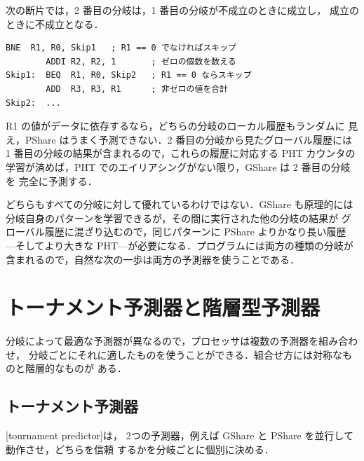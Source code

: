 \documentclass[../main.tex]{subfiles}
\begin{document}
\begin{example}
  次の断片では，2 番目の分岐は，1 番目の分岐が不成立のときに成立し，
  成立のときに不成立となる．
  \begin{lstlisting}[language={[x86masm]Assembler}, numbers=none]
        BNE  R1, R0, Skip1   ; R1 == 0 でなければスキップ
        ADDI R2, R2, 1       ; ゼロの個数を数える
Skip1:  BEQ  R1, R0, Skip2   ; R1 == 0 ならスキップ
        ADD  R3, R3, R1      ; 非ゼロの値を合計
Skip2:  ...
\end{lstlisting}
  R1 の値がデータに依存するなら，どちらの分岐のローカル履歴もランダムに
  見え，PShare はうまく予測できない．2 番目の分岐から見たグローバル履歴には
  1 番目の分岐の結果が含まれるので，これらの履歴に対応する PHT カウンタの
  学習が済めば，PHT でのエイリアシングがない限り，GShare は 2 番目の分岐を
  完全に予測する．
\end{example}

どちらもすべての分岐に対して優れているわけではない．GShare も原理的には
分岐自身のパターンを学習できるが，その間に実行された他の分岐の結果が
グローバル履歴に混ざり込むので，同じパターンに PShare よりかなり長い履歴
---そしてより大きな PHT---が必要になる．プログラムには両方の種類の分岐が
含まれるので，自然な次の一歩は両方の予測器を使うことである．

\section{トーナメント予測器と階層型予測器}
\label{sec:l04-hybrid}

分岐によって最適な予測器が異なるので，プロセッサは複数の予測器を組み合わせ，
分岐ごとにそれに適したものを使うことができる．組合せ方には対称なものと階層的なものが
ある．

\subsection{トーナメント予測器}

[tournament predictor]は，
2つの予測器，例えば GShare と PShare を並行して動作させ，どちらを信頼
するかを分岐ごとに個別に決める．
\end{document}
